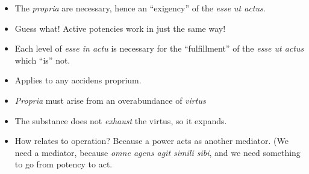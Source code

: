 \begin{DONE}

\begin{itemize}
\item The \emph{propria} are necessary, hence an ``exigency'' of the \emph{esse ut actus}.

\item Guess what! Active potencies work in just the same way!

\item Each level of \emph{esse in actu} is necessary for the ``fulfillment'' of the \emph{esse ut actus} which ``is'' not.

  \item Applies to any accidens proprium.
  \item \emph{Propria} must arise from an overabundance of \emph{virtus}
  \item  The substance does not \emph{exhaust} the virtus, so it expands.
  \item How relates to operation? Because a power acts as another mediator. (We need a mediator, because \emph{omne agens agit simili sibi}, and we need something to go from potency to act.

\end{itemize}

\end{DONE}

